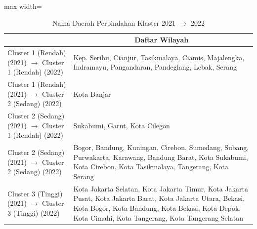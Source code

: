 \begin{table}[H]
\centering
\caption{Nama Daerah Perpindahan Klaster 2021 \(\rightarrow\) 2022} \label{tab:app1transname2021x2022}
\begin{adjustbox}{max width=\textwidth}
\begin{tabular}{|>{\centering\arraybackslash}p{4cm}|p{10cm}|}
\hline
\multicolumn{1}{|c|}{\textbf{Kategori}} & \multicolumn{1}{c|}{\textbf{Daftar Wilayah}} \\
\hline
Cluster 1 (Rendah) (2021) \(\rightarrow\) Cluster 1 (Rendah) (2022) & Kep. Seribu, Cianjur, Tasikmalaya, Ciamis, Majalengka, Indramayu, Pangandaran, Pandeglang, Lebak, Serang \\
\hline
Cluster 1 (Rendah) (2021) \(\rightarrow\) Cluster 2 (Sedang) (2022) & Kota Banjar \\
\hline
Cluster 2 (Sedang) (2021) \(\rightarrow\) Cluster 1 (Rendah) (2022) & Sukabumi, Garut, Kota Cilegon \\
\hline
Cluster 2 (Sedang) (2021) \(\rightarrow\) Cluster 2 (Sedang) (2022) & Bogor, Bandung, Kuningan, Cirebon, Sumedang, Subang, Purwakarta, Karawang, Bandung Barat, Kota Sukabumi, Kota Cirebon, Kota Tasikmalaya, Tangerang, Kota Serang \\
\hline
Cluster 3 (Tinggi) (2021) \(\rightarrow\) Cluster 3 (Tinggi) (2022) & Kota Jakarta Selatan, Kota Jakarta Timur, Kota Jakarta Pusat, Kota Jakarta Barat, Kota Jakarta Utara, Bekasi, Kota Bogor, Kota Bandung, Kota Bekasi, Kota Depok, Kota Cimahi, Kota Tangerang, Kota Tangerang Selatan \\
\hline
\end{tabular}
\end{adjustbox}
\end{table}